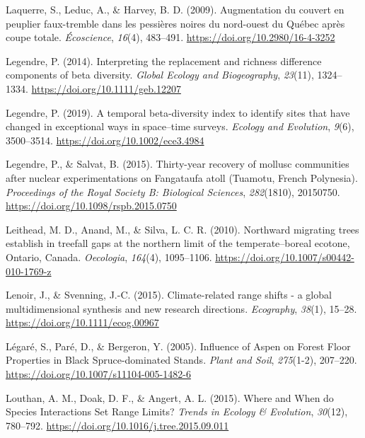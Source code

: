 \documentclass[
]{article}
\begin{document}
\leavevmode\hypertarget{ref-laquerre_augmentation_2009}{}%
Laquerre, S., Leduc, A., \& Harvey, B. D. (2009). Augmentation du
couvert en peuplier faux-tremble dans les pessières noires du nord-ouest
du Québec après coupe totale. \emph{Écoscience}, \emph{16}(4), 483--491.
\url{https://doi.org/10.2980/16-4-3252}

\leavevmode\hypertarget{ref-legendre_interpreting_2014}{}%
Legendre, P. (2014). Interpreting the replacement and richness
difference components of beta diversity. \emph{Global Ecology and
Biogeography}, \emph{23}(11), 1324--1334.
\url{https://doi.org/10.1111/geb.12207}

\leavevmode\hypertarget{ref-legendre_temporal_2019}{}%
Legendre, P. (2019). A temporal beta-diversity index to identify sites
that have changed in exceptional ways in space--time surveys.
\emph{Ecology and Evolution}, \emph{9}(6), 3500--3514.
\url{https://doi.org/10.1002/ece3.4984}

\leavevmode\hypertarget{ref-legendre_thirty-year_2015}{}%
Legendre, P., \& Salvat, B. (2015). Thirty-year recovery of mollusc
communities after nuclear experimentations on Fangataufa atoll (Tuamotu,
French Polynesia). \emph{Proceedings of the Royal Society B: Biological
Sciences}, \emph{282}(1810), 20150750.
\url{https://doi.org/10.1098/rspb.2015.0750}

\leavevmode\hypertarget{ref-leithead_northward_2010}{}%
Leithead, M. D., Anand, M., \& Silva, L. C. R. (2010). Northward
migrating trees establish in treefall gaps at the northern limit of the
temperate--boreal ecotone, Ontario, Canada. \emph{Oecologia},
\emph{164}(4), 1095--1106.
\url{https://doi.org/10.1007/s00442-010-1769-z}

\leavevmode\hypertarget{ref-lenoir_climate-related_2015}{}%
Lenoir, J., \& Svenning, J.-C. (2015). Climate-related range shifts - a
global multidimensional synthesis and new research directions.
\emph{Ecography}, \emph{38}(1), 15--28.
\url{https://doi.org/10.1111/ecog.00967}

\leavevmode\hypertarget{ref-legare_influence_2005}{}%
Légaré, S., Paré, D., \& Bergeron, Y. (2005). Influence of Aspen on
Forest Floor Properties in Black Spruce-dominated Stands. \emph{Plant
and Soil}, \emph{275}(1-2), 207--220.
\url{https://doi.org/10.1007/s11104-005-1482-6}

\leavevmode\hypertarget{ref-louthan_where_2015}{}%
Louthan, A. M., Doak, D. F., \& Angert, A. L. (2015). Where and When do
Species Interactions Set Range Limits? \emph{Trends in Ecology \&
Evolution}, \emph{30}(12), 780--792.
\url{https://doi.org/10.1016/j.tree.2015.09.011}
\end{document}
